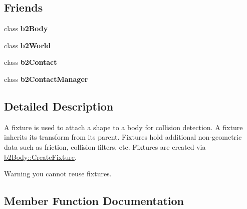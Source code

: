 \subsection*{Friends}
\begin{DoxyCompactItemize}
\item 
class {\bfseries b2\+Body}\hypertarget{classb2_fixture_a010ab52de250e5fe30a45d642f46405b}{}\label{classb2_fixture_a010ab52de250e5fe30a45d642f46405b}

\item 
class {\bfseries b2\+World}\hypertarget{classb2_fixture_a4bd536c5a7c0587913765bbc2693ceea}{}\label{classb2_fixture_a4bd536c5a7c0587913765bbc2693ceea}

\item 
class {\bfseries b2\+Contact}\hypertarget{classb2_fixture_a6c4ac5df27ec498dd9e4281352b7a789}{}\label{classb2_fixture_a6c4ac5df27ec498dd9e4281352b7a789}

\item 
class {\bfseries b2\+Contact\+Manager}\hypertarget{classb2_fixture_aece264d42f69aed410f5eb3beba6ddf2}{}\label{classb2_fixture_aece264d42f69aed410f5eb3beba6ddf2}

\end{DoxyCompactItemize}


\subsection{Detailed Description}
A fixture is used to attach a shape to a body for collision detection. A fixture inherits its transform from its parent. Fixtures hold additional non-\/geometric data such as friction, collision filters, etc. Fixtures are created via \hyperlink{classb2_body_a40dda91b34418bb40e31e2db9b1b76a5}{b2\+Body\+::\+Create\+Fixture}. \begin{DoxyWarning}{Warning}
you cannot reuse fixtures. 
\end{DoxyWarning}


\subsection{Member Function Documentation}
